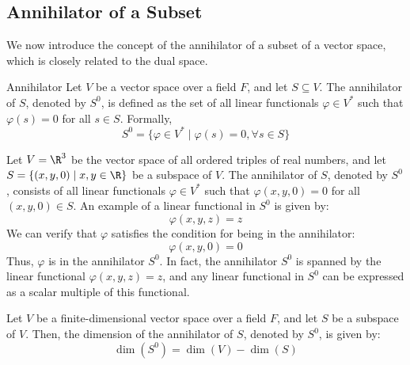 \documentclass[openany]{book}
\begin{document}
\subsection{Annihilator of a Subset}
We now introduce the concept of the annihilator of a subset of a vector space, which is closely related to the dual space.
\begin{mydefinition}{Annihilator}
Let $V$ be a vector space over a field $F$, and let $S \subseteq V$. The annihilator of $S$, denoted by $S^0$, is defined as the set of all linear functionals $\varphi \in V^*$ such that $\varphi(s) = 0$ for all $s \in S$. Formally, 
$$S^0 = \{\varphi \in V^* \mid \varphi(s) = 0, \forall s \in S\}$$
\end{mydefinition}
\begin{example}
Let $V = \R^3$ be the vector space of all ordered triples of real numbers, and let $S = \{(x, y, 0) \mid x, y \in \R\}$ be a subspace of $V$. The annihilator of $S$, denoted by $S^0$, consists of all linear functionals $\varphi \in V^*$ such that $\varphi(x, y, 0) = 0$ for all $(x, y, 0) \in S$. An example of a linear functional in $S^0$ is given by:
$$\varphi(x, y, z) = z$$
We can verify that $\varphi$ satisfies the condition for being in the annihilator:
$$\varphi(x, y, 0) = 0$$
Thus, $\varphi$ is in the annihilator $S^0$. In fact, the annihilator $S^0$ is spanned by the linear functional $\varphi(x, y, z) = z$, and any linear functional in $S^0$ can be expressed as a scalar multiple of this functional.
\end{example}
\begin{mytheorem}
Let $V$ be a finite-dimensional vector space over a field $F$, and let $S$ be a subspace of $V$. Then, the dimension of the annihilator of $S$, denoted by $S^0$, is given by:
$$\dim(S^0) = \dim(V) - \dim(S)$$
\end{mytheorem}
\end{document}

